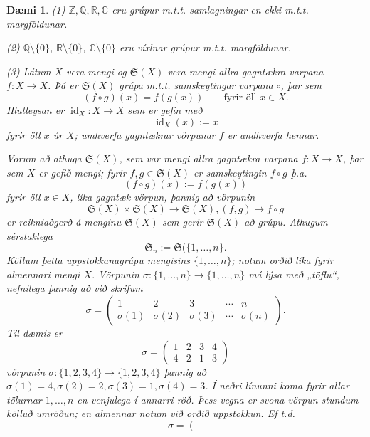 \documentclass[a4paper,icelandic,11pt]{book}
\theoremstyle{plain}
\newtheorem{daemi}{Dæmi}[chapter]
\newcommand{\R}{\mathbb{R}}
\newcommand{\Z}{\mathbb{Z}}
\newcommand{\Q}{\mathbb{Q}}
\newcommand{\C}{\mathbb{C}}
\DeclareMathOperator{\id}{id} %
\begin{document}
\begin{daemi}
  (1) $\Z, \Q, \R, \C$ eru grúpur m.t.t. samlagningar en ekki m.t.t. margföldunar.

  (2) $\Q \setminus \{0\}$, $\R\setminus \{0\}$, $\C\setminus\{0\}$ eru
  víxlnar grúpur m.t.t. margföldunar.

  (3) Látum $X$ vera mengi og $\mathfrak S (X)$ vera mengi allra gagntækra
  varpana $f: X\to X$. Þá er $\mathfrak S (X)$ grúpa m.t.t. samskeytingar
  varpana $\circ$, þar sem
  \[ (f\circ g) (x) = f(g(x)) \qquad \text{fyrir öll } x\in X . \]
  Hlutleysan er $\id_X : X\to X$ sem er gefin með \[\id_X (x) := x \] fyrir
  öll $x$ úr $X$; umhverfa gagntækrar vörpunar $f$ er
  \emph{andhverfa} hennar.

  Vorum að athuga $\mathfrak S(X)$, sem var mengi allra gagntækra varpana
  $f:X\to X$, þar sem $X$ er gefið mengi; fyrir $f,g\in \mathfrak S(X)$ er
  samskeytingin $f\circ g$ þ.a.
  \[ (f\circ g)(x) := f(g(x)) \]
  fyrir öll $x\in X$, líka gagntæk vörpun, þannig að vörpunin
  \[ \mathfrak S(X)\times\mathfrak S (X) \to \mathfrak S(X), (f,g)\mapsto f\circ g \]
  er reikniaðgerð á menginu $\mathfrak S (X)$ sem gerir $\mathfrak S(X)$ að
  grúpu. Athugum sérstaklega
  \[ \mathfrak S_n := \mathfrak S (\{1,\dots,n\} . \]
  Köllum þetta
  \emph{uppstokkanagrúpu}
  mengisins $\{1,\dots,n\}$; notum orðið
  líka fyrir almennari mengi $X$. Vörpunin
  $\sigma:\{1,\dots,n\}\to\{1,\dots,n\}$ má lýsa með „töflu“, nefnilega þannig
  að við skrifum
  \[ \sigma = \left (
    \begin{matrix}
      1 & 2 & 3 & \cdots & n \\
      \sigma (1) & \sigma (2) & \sigma(3) &\cdots &\sigma(n)
    \end{matrix}
  \right ). \]
  Til dæmis er
  \[ \sigma = \left(
  \begin{matrix}
    1 & 2 & 3 & 4\\
    4 & 2 & 1 & 3 
  \end{matrix}
  \right ) \]
  vörpunin $\sigma : \{1,2,3,4\} \to \{1,2,3,4\}$ þannig að $\sigma(1) =
  4,\sigma(2) = 2, \sigma(3) = 1, \sigma(4) = 3$. Í neðri línunni koma fyrir
  allar tölurnar $1,\dots,n$ en venjulega í annarri röð. Þess vegna er svona
  vörpun stundum kölluð \emph{umröðun}; en almennar notum við orðið
  \emph{uppstokkun}.
  Ef t.d.
  \[ \sigma = \left(
    \begin{matrix}

\end{matrix}\]
\end{daemi}
\end{document}
